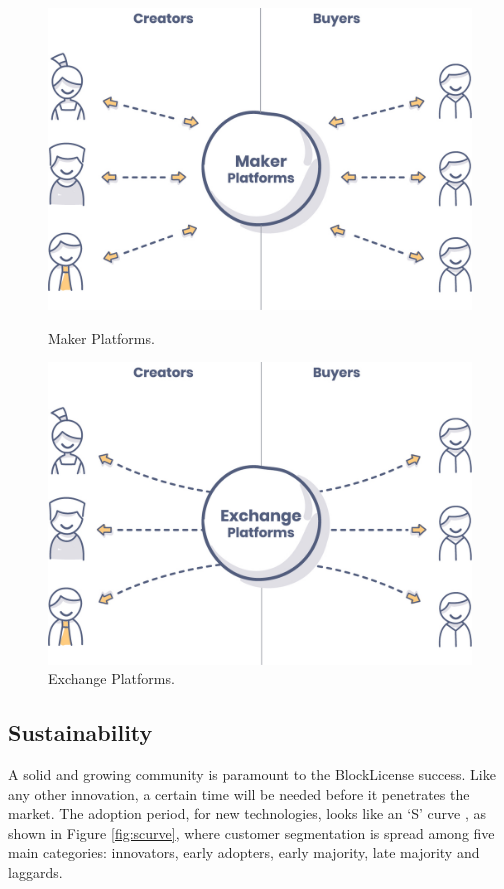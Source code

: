 \begin{figure}[h]
\centering
\begin{minipage}{.45\textwidth}
  \centering
  \includegraphics[width=.8\linewidth]{./figures/fig9.jpg}
  \caption{Maker Platforms.}
  \label{fig:maker}
\end{minipage}
\begin{minipage}{.45\textwidth}
  \centering
  \includegraphics[width=.8\linewidth]{./figures/fig10.jpg}
  \caption{Exchange Platforms.}
  \label{fig:exchange}
\end{minipage}%
\end{figure}
 
\subsection{Sustainability}

A solid and growing community is paramount to the BlockLicense success. Like any other innovation, a certain time will be needed before it penetrates the market.  The adoption period, for new technologies, looks like an ‘S’ curve \cite{pierre}, as shown in Figure \ref{fig:scurve}, where customer segmentation is spread among five main categories: innovators, early adopters, early majority, late majority and laggards.

